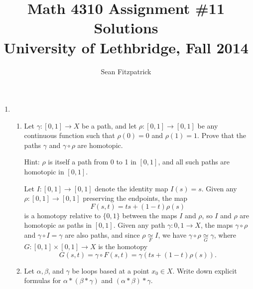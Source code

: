 \documentclass[letterpaper,12pt]{article}
\title{Math 4310 Assignment \#11 Solutions\\University of Lethbridge, Fall 2014}
\author{Sean Fitzpatrick}
\begin{document}
 \maketitle


\begin{enumerate}
\item \begin{enumerate}
\item Let $\gamma: [0,1]\to X$ be a path, and let $\rho:[0,1]\to [0,1]$ be any continuous function such that $\rho(0)=0$ and $\rho(1)=1$. Prove that the paths $\gamma$ and $\gamma\circ \rho$ are homotopic.

Hint: $\rho$ is itself a path from 0 to 1 in $[0,1]$, and all such paths are homotopic in $[0,1]$.

\bigskip

Let $I:[0,1]\to [0,1]$ denote the identity map $I(s)=s$. Given any $\rho:[0,1]\to [0,1]$ preserving the endpoints, the map
\[
 F(s,t) = ts+(1-t)\rho(s)
\]
is a homotopy relative to $\{0,1\}$ between the maps $I$ and $\rho$, so $I$ and $\rho$ are homotopic as paths in $[0,1]$. Given any path $\gamma:{0,1}\to X$, the maps $\gamma\circ\rho$ and $\gamma\circ I = \gamma$ are also paths, and since $\rho\underset{F}{\simeq} I$, we have $\gamma\circ\rho \underset{G}{\simeq}\gamma$, where $G:[0,1]\times [0,1]\to X$ is the homotopy
\[
 G(s,t) = \gamma\circ F(s,t) = \gamma(ts+(1-t)\rho(s)).
\]

\bigskip

\item Let $\alpha, \beta$, and $\gamma$ be loops based at a point $x_0\in X$. Write down explicit formulas for $\alpha\ast(\beta\ast\gamma)$ and $(\alpha\ast\beta)\ast\gamma$.

\bigskip


\end{enumerate}
\end{enumerate}
\end{document}
